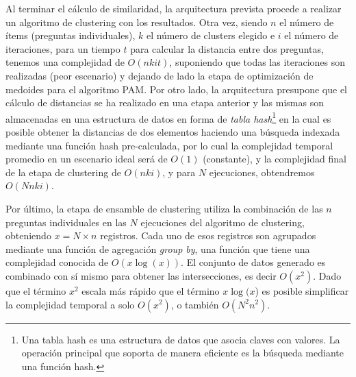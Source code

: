 \bigskip Al terminar el cálculo de similaridad, la arquitectura prevista procede a realizar un algoritmo de clustering con los resultados. Otra vez, siendo \(n\) el número de ítems (preguntas individuales), \(k\) el número de clusters elegido e \(i\) el número de iteraciones, para un tiempo \(t\) para calcular la distancia entre dos preguntas, tenemos una complejidad de \(O(nkit)\), suponiendo que todas las iteraciones son realizadas (peor escenario) y dejando de lado la etapa de optimización de medoides para el algoritmo PAM. Por otro lado, la arquitectura presupone que el cálculo de distancias se ha realizado en una etapa anterior y las mismas son almacenadas en una estructura de datos en forma de \textit{tabla hash}\footnote{Una tabla hash es una estructura de datos que asocia claves con valores. La operación principal que soporta de manera eficiente es la búsqueda mediante una función hash.} en la cual es posible obtener la distancias de dos elementos haciendo una búsqueda indexada mediante una función hash pre-calculada, por lo cual la complejidad temporal promedio en un escenario ideal será de \(O(1)\) (constante), y la complejidad final de la etapa de clustering de \(O(nki)\), y para \(N\) ejecuciones, obtendremos \(O(Nnki)\).

\bigskip Por último, la etapa de ensamble de clustering utiliza la combinación de las \(n\) preguntas individuales en las \(N\) ejecuciones del algoritmo de clustering, obteniendo \(x = N \times n\) registros. Cada uno de esos registros son agrupados mediante una función de agregación \textit{group by}, una función que tiene una complejidad conocida de \(O(x\log(x))\). El conjunto de datos generado es combinado con sí mismo para obtener las intersecciones, es decir \(O(x^2)\). Dado que el término \(x^2\) escala más rápido que el término \(x\log(x\)) es posible simplificar la complejidad temporal a solo \(O(x^2)\), o también \(O(N^2n^2)\).

